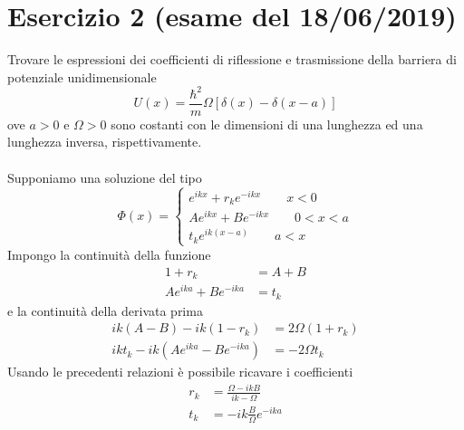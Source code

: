 \documentclass[a4paper]{article}
\begin{document}
    \section*{Esercizio 2 (esame del 18/06/2019)}
        Trovare le espressioni dei coefficienti di riflessione e trasmissione della barriera di potenziale unidimensionale
        \begin{equation*}
            U(x)=\frac{\hbar^2}{m}\Omega\left[\delta(x)-\delta(x-a)\right]
        \end{equation*}
        ove $a > 0$ e $\Omega > 0$ sono costanti con le dimensioni di una lunghezza ed una lunghezza inversa, rispettivamente.
        \\
        \\
        Supponiamo una soluzione del tipo
        \begin{equation*}
            \Phi(x)=
            \begin{cases}
                e^{ikx}+r_ke^{-ikx} \quad\quad x<0\\
                Ae^{ikx}+Be^{-ikx} \quad\quad 0<x<a\\
                t_ke^{ik(x-a)} \quad\quad a<x
            \end{cases}
        \end{equation*}
        Impongo la continuità della funzione
        \begin{equation*}
            \begin{split}
                1+r_k&=A+B\\
                Ae^{ika}+Be^{-ika}&=t_k
            \end{split}
        \end{equation*}
        e la continuità della derivata prima
        \begin{equation*}
            \begin{split}
                ik(A-B)-ik(1-r_k)&=2\Omega(1+r_k)\\
                ikt_k-ik(Ae^{ika}-Be^{-ika})&=-2\Omega t_k
            \end{split}
        \end{equation*}
        Usando le precedenti relazioni è possibile ricavare i coefficienti
        \begin{equation*}
            \begin{split}
                r_k&=\frac{\Omega-ikB}{ik-\Omega}\\
                t_k&=-ik\frac{B}{\Omega}e^{-ika}
            \end{split}
        \end{equation*}
\end{document}
